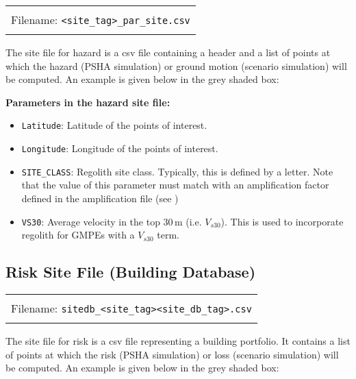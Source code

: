 \begin{center}
\begin{tabular}{|c|}
\hline
\\
Filename: \texttt{<site\_tag>\_par\_site.csv} \\
\\
\hline
\end{tabular}
\end{center}

The site file for hazard is a csv file containing a header and a list
of points at which the hazard (PSHA simulation) or ground motion
(scenario simulation) will be computed. An example is given below in
the grey shaded box:
 


\textbf{Parameters in the hazard site file:}
\begin{itemize}
\item \texttt{Latitude}: Latitude of the points of interest.
\item \texttt{Longitude}: Longitude of the points of interest.
\item \texttt{SITE\_CLASS}: Regolith site class. Typically, this is defined
by a letter. Note that the value of this parameter must match with
an amplification factor defined in the amplification file (see
)
\item \texttt{VS30}: Average velocity in the top 30\,m (i.e. $V_{s30}$). This is used
to incorporate regolith for GMPEs with a $V_{s30}$ term.
\end{itemize}

\subsection{Risk Site File (Building Database)}
\label{sec:grids-bdatabase}

\begin{center}
\begin{tabular}{|c|}
\hline
\\
Filename: \texttt{sitedb\_<site\_tag><site\_db\_tag>.csv} \\
\\
\hline
\end{tabular}
\end{center}

The site file for risk is a csv file representing a building
portfolio. It contains a list of points at which the risk (PSHA simulation)
 or loss (scenario simulation) will be computed. An example is
 given below in the grey shaded box:



